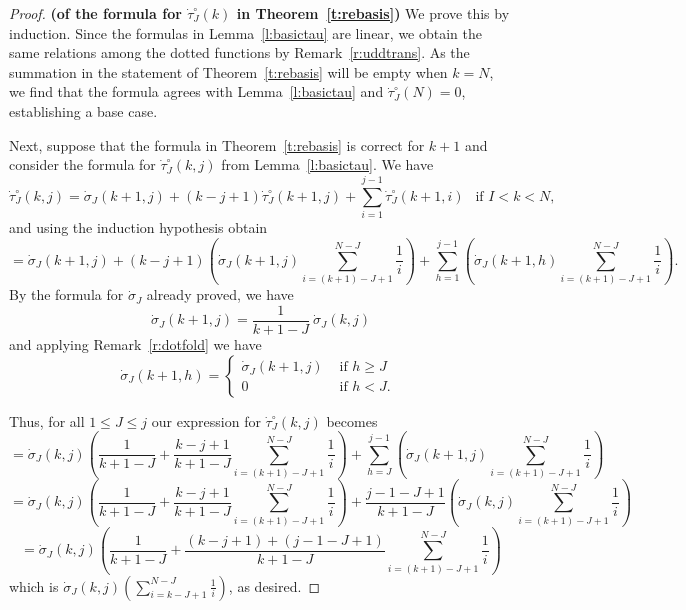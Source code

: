 \documentclass[11pt]{amsart}   %
\theoremstyle{definition}
\theoremstyle{remark}
\numberwithin{equation}{section}
\theoremstyle{theorem}
\begin{document}
\begin{proof}{\bf (of the formula for $\dot\tau^\circ_J(k)$ in Theorem~\ref{t:rebasis})}
We prove this by induction.  
Since the formulas in Lemma~\ref{l:basictau} are linear, we obtain the same relations among the dotted functions by Remark~\ref{r:uddtrans}.  As the summation in the statement of Theorem~\ref{t:rebasis} will be empty when $k = N$, we find that the formula agrees with Lemma~\ref{l:basictau} and $\dot\tau^\circ_J(N) = 0$, establishing a base case.

Next, suppose that the formula in Theorem~\ref{t:rebasis} is correct for $k+1$ and consider the formula for $\dot\tau^\circ_J(k,j)$ from Lemma~\ref{l:basictau}.  We have
\[ \dot\tau^\circ_J(k,j) = \dot\sigma_J(k+1, j) + (k-j+1) \dot\tau^\circ_J(k+1, j) + \sum_{i=1}^{j-1} \dot\tau^\circ_J(k+1, i) \ \ \text{ if $I < k < N$, } \]
and using the induction hypothesis obtain
\[ = \dot\sigma_J(k+1, j) + (k-j+1) 
    \left( \dot\sigma_J(k+1, j) \sum_{i=(k+1)-J+1}^{N-J} \frac{1}{i} \right)
 + \sum_{h=1}^{j-1} 
 \left( \dot\sigma_J(k+1, h) \sum_{i=(k+1)-J+1}^{N-J} \frac{1}{i} \right).
 \]
By the formula for $\dot\sigma_J$ already proved, we have
\[ \dot\sigma_J(k+1, j) = \frac{1}{k+1-J}\ \dot\sigma_J(k, j) \]
and applying Remark~\ref{r:dotfold} we have
\[ \dot\sigma_J(k+1,h) = \begin{cases} \dot\sigma_J(k+1, j) & \text{ if $h \geq J$ } \\ 0 & \text{ if $h < J$. } \end{cases} \]

Thus, for all $1 \leq J \leq j$ our expression for $\dot\tau^\circ_J(k,j)$ becomes
\[ = \dot\sigma_J(k, j) \left( \frac{1}{k+1-J} + \frac{k-j+1}{k+1-J} \sum_{i=(k+1)-J+1}^{N-J} \frac{1}{i} \right) + \sum_{h=J}^{j-1} \left( \dot\sigma_J(k+1, j) \sum_{i=(k+1)-J+1}^{N-J} \frac{1}{i} \right)  \]
\[ = \dot\sigma_J(k, j) \left( \frac{1}{k+1-J} + \frac{k-j+1}{k+1-J} \sum_{i=(k+1)-J+1}^{N-J} \frac{1}{i} \right) + \frac{j-1-J+1}{k+1-J} \left( \dot\sigma_J(k, j) \sum_{i=(k+1)-J+1}^{N-J} \frac{1}{i} \right)  \]
\[ = \dot\sigma_J(k, j) \left( \frac{1}{k+1-J} + \frac{\left(k-j+1\right) + \left(j-1-J+1\right)}{k+1-J} \sum_{i=(k+1)-J+1}^{N-J} \frac{1}{i} \right) \]
which is $\dot\sigma_J(k, j) \left( \sum_{i=k-J+1}^{N-J} \frac{1}{i} \right)$, as desired.
\end{proof}
\end{document}
